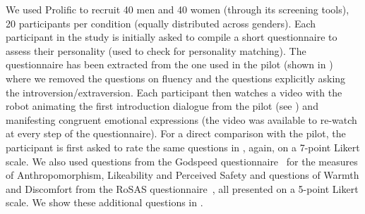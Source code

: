 \documentclass[nomenclature, english, biblatex]{kththesis}
\begin{document}
We used Prolific to recruit 40 men and 40 women (through its screening tools), 20 participants per condition (equally distributed across genders). Each participant in the study is initially asked to compile a short questionnaire to assess their personality (used to check for personality matching). The questionnaire has been extracted from the one used in the pilot (shown in ) where we removed the questions on fluency and the questions explicitly asking the introversion/extraversion. Each participant then watches a video with the robot animating the first introduction dialogue from the pilot (see ) and manifesting congruent emotional expressions (the video was available to re-watch at every step of the questionnaire). For a direct comparison with the pilot, the participant is first asked to rate the same questions in , again, on a 7-point Likert scale. We also used questions from the Godspeed questionnaire~\cite{bartneck2009measurement} for the measures of Anthropomorphism, Likeability and Perceived Safety and questions of Warmth and Discomfort from the RoSAS questionnaire~\cite{carpinella2017robotic}, all presented on a 5-point Likert scale. We show these additional questions in .
\end{document}
